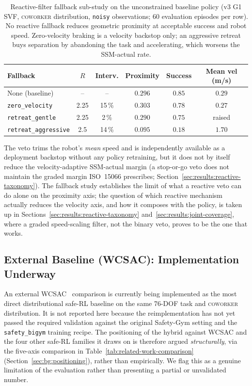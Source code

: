 \documentclass[11pt,a4paper]{report}
\newcommand{\ssm}{SSM}
\newcommand{\iso}{ISO~15066}
\newcommand{\sbigym}{\texttt{safety\_bigym}}
\newcommand{\coworker}{\textsc{coworker}}
\begin{document}
\begin{table}[h]
\centering
\small
\caption{Reactive-filter fallback sub-study on the unconstrained
baseline policy (v3 G1 SVF, \coworker{} distribution, \texttt{noisy}
observations; 60 evaluation episodes per row). No reactive fallback
reduces geometric proximity at acceptable success and robot speed.
Zero-velocity braking is a velocity backstop only; an aggressive
retreat buys separation by abandoning the task and accelerating,
which worsens the \ssm{}-actual rate.}
\label{tab:filter-fallback}
\begin{tabular}{lccccc}
\toprule
Fallback & $R$ & Interv. & Proximity & Success & Mean vel (m/s) \\
\midrule
None (baseline)        & --   & --      & $0.296$ & $0.85$ & $0.29$ \\
\texttt{zero\_velocity}    & 2.25 & 15\,\% & $0.303$ & $0.78$ & $0.27$ \\
\texttt{retreat\_gentle}   & 2.25 & 2\,\%  & $0.290$ & $0.75$ & raised \\
\texttt{retreat\_aggressive} & 2.5 & 14\,\% & $0.095$ & $0.18$ & $1.70$ \\
\bottomrule
\end{tabular}
\end{table}

The veto trims the robot's \emph{mean} speed and is independently
available as a deployment backstop without any policy retraining, but
it does not by itself reduce the velocity-adaptive \ssm{}-actual margin
(a stop-or-go veto does not maintain the graded margin \iso{}
prescribes; Section~\ref{sec:results:reactive-taxonomy}). The fallback
study establishes the limit of what a reactive veto can do alone on
the proximity axis; the question of which reactive mechanism actually
reduces the velocity axis, and how it composes with the policy, is
taken up in Sections~\ref{sec:results:reactive-taxonomy}
and~\ref{sec:results:joint-coverage}, where a graded speed-scaling
filter, not the binary veto, proves to be the one that works.

\subsection{External Baseline (WCSAC): Implementation Underway}
\label{sec:results:wcsac}

An external WCSAC~\cite{yang2021wcsac} comparison is currently being
implemented as the most direct distributional safe-RL baseline on the
same 76-DOF task and \coworker{} distribution. It is not reported here
because the reimplementation has not yet passed the required validation
against the original Safety-Gym setting and the \sbigym{} training
recipe. The positioning of the hybrid against WCSAC and the four other
safe-RL families it draws on is therefore argued
\emph{structurally}, via the five-axis comparison in
Table~\ref{tab:related-work-comparison}
(Section~\ref{sec:bg:positioning}), rather than empirically. We flag
this as a genuine limitation of the evaluation rather than presenting a
partial or unvalidated number.
\end{document}
